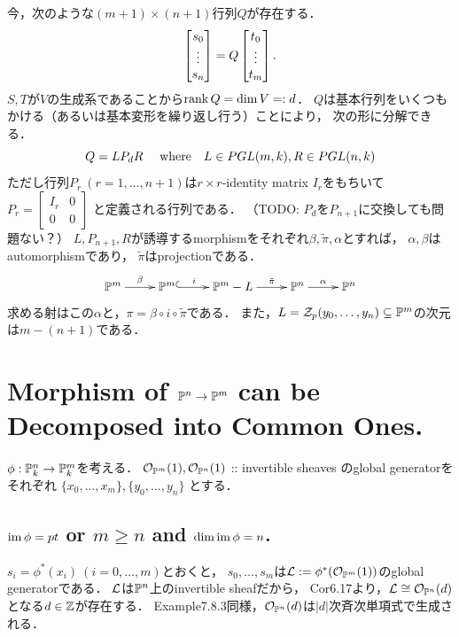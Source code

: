 \documentclass[a4paper]{jsarticle}
\begin{document}
    今，次のような$(m+1) \times (n+1)$行列$Q$が存在する．
    \[
        \begin{bmatrix} s_0 \\ \vdots \\ s_n \end{bmatrix}
        =Q \begin{bmatrix} t_0 \\ \vdots \\ t_m \end{bmatrix}.
    \]
    $S,T$が$V$の生成系であることから$\operatorname{rank} Q=\dim V=:d$．
    $Q$は基本行列をいくつもかける（あるいは基本変形を繰り返し行う）ことにより，
    次の形に分解できる．
    \[
        Q=L P_{d} R~~
        ~~\text{where}~~~ L \in PGL(m,k), R \in PGL(n,k)
    \]
    ただし行列$P_r ~(r=1,\dots,n+1)$は$r \times r$-identity matrix $I_r$をもちいて
    $P_{r}=
    \begin{bmatrix}
        I_r & 0 \\
        0 & 0
    \end{bmatrix}$
    と定義される行列である．
    （TODO: $P_{d}$を$P_{n+1}$に交換しても問題ない？）
    $L, P_{n+1}, R$が誘導するmorphismをそれぞれ$\beta, \tilde{\pi} ,\alpha$とすれば，
    $\alpha, \beta$はautomorphismであり，
    $\tilde{\pi}$はprojectionである．
    \[
        \xymatrix
        {
            \proj^m \ar[r]^-{\beta}& \proj^m
            \ar@{^{(}->}[r]^-{i}& \proj^m-L
            \ar[r]^-{\tilde{\pi}}& \proj^n
            \ar[r]^-{\alpha}& \proj^n
        }
    \]
    求める射はこの$\alpha$と，$\pi=\beta \circ i \circ \tilde{\pi}$である．
    また，$L=\mathcal{Z}_p(y_0,\dots,y_n) \subseteq \mathbb{P}^m$の次元は$m-(n+1)$である．

\section{Morphism of $\mathbb{P}^n \to \mathbb{P}^m$ can be Decomposed into Common Ones.} %
    $\phi: \mathbb{P}^n_k \to \mathbb{P}^m_k$を考える．
    $\mathcal{O}_{\mathbb{P}^m}(1), \mathcal{O}_{\mathbb{P}^n}(1)$
     :: invertible sheaves
    のglobal generatorをそれぞれ
    $\{x_0,\dots,x_m\}, \{y_0,\dots,y_n\}$
    とする．

    \subsection{$\operatorname{im} \phi=pt$ or $m \geq n$ and $\dim \operatorname{im} \phi=n$.}
    $s_i=\phi^*(x_i)~(i=0,\dots,m)$とおくと，
    $s_0,\dots,s_m$は$\mathcal{L}:=\phi^*(\mathcal{O}_{\mathbb{P}^m}(1))$のglobal generatorである．
    $\mathcal{L}$は$\mathbb{P}^n$上のinvertible sheafだから，
    Cor6.17より，$\mathcal{L} \cong \mathcal{O}_{\mathbb{P}^n}(d)$となる$d \in \mathbb{Z}$が存在する．
    Example7.8.3同様，$\mathcal{O}_{\mathbb{P}^n}(d)$は$|d|$次斉次単項式で生成される．
\end{document}
